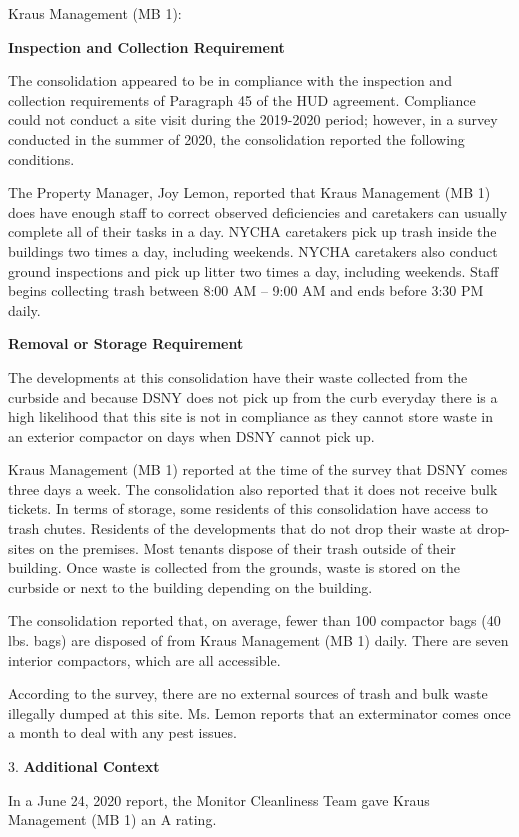 Kraus Management (MB 1):

\textbf{Inspection and Collection Requirement}

The consolidation appeared to be in compliance with the inspection and collection requirements of Paragraph 45 of the HUD agreement. Compliance could not conduct a site visit during the 2019-2020 period; however, in a survey conducted in the summer of 2020, the consolidation reported the following conditions.

The Property Manager, Joy Lemon, reported that Kraus Management (MB 1) does have enough staff to correct observed deficiencies and caretakers can usually complete all of their tasks in a day. NYCHA caretakers pick up trash inside the buildings two times a day, including weekends. NYCHA caretakers also conduct ground inspections and pick up litter two times a day, including weekends. Staff begins collecting trash between 8:00 AM -- 9:00 AM and ends before 3:30 PM daily. 

\textbf{Removal or Storage Requirement}

The developments at this consolidation have their waste collected from the curbside and because DSNY does not pick up from the curb everyday there is a high likelihood that this site is not in compliance as they cannot store waste in an exterior compactor on days when DSNY cannot pick up. 

Kraus Management (MB 1) reported at the time of the survey that DSNY comes three days a week. The consolidation also reported that it does not receive bulk tickets. In terms of storage, some residents of this consolidation have access to trash chutes. Residents of the developments that do not drop their waste at drop-sites on the premises. Most tenants dispose of their trash outside of their building. Once waste is collected from the grounds, waste is stored on the curbside or next to the building depending on the building. 

The consolidation reported that, on average, fewer than 100 compactor bags (40 lbs. bags) are disposed of from Kraus Management (MB 1) daily. There are seven interior compactors, which are all accessible. 

According to the survey, there are no external sources of trash and bulk waste illegally dumped at this site. Ms. Lemon reports that an exterminator comes once a month to deal with any pest issues. 

3. \textbf{Additional Context} 

In a June 24, 2020 report, the Monitor Cleanliness Team gave Kraus Management (MB 1)  an A rating. 